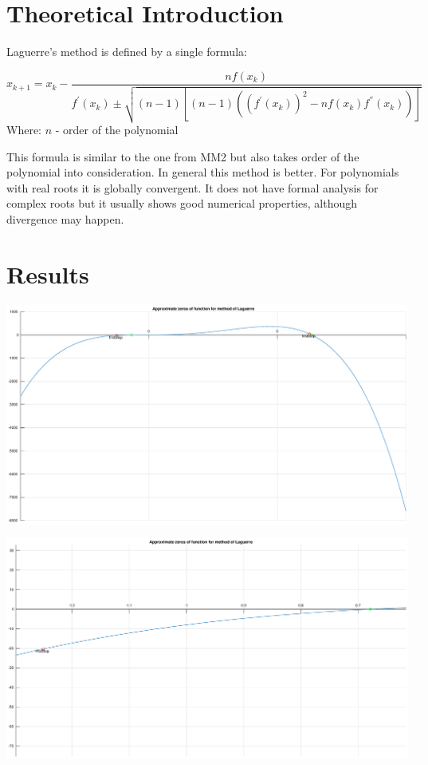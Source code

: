 \documentclass[12pt]{report}
\begin{document}
\section{Theoretical Introduction}
Laguerre's method is defined by a single formula:

\[ x_{k+1} = x_k - \frac{nf(x_k)}{f^{'}(x_k) \pm \sqrt{(n-1)[(n-1)( (f^{'}(x_k))^2 - nf(x_k)f^{''}(x_k) )]}} \]
Where:
$n$ - order of the polynomial

This formula is similar to the one from MM2 but also takes order of the polynomial into consideration. In general this method is better. For polynomials with real roots it is globally convergent. It does not have formal analysis for complex roots but it usually shows good numerical properties, although divergence may happen.

\section{Results}

\begin{center}
   \includegraphics[scale=0.25]{task3overall.eps}
\end{center}


\begin{center}
   \includegraphics[scale=0.25]{task3left.eps}
\end{center}
\end{document}
